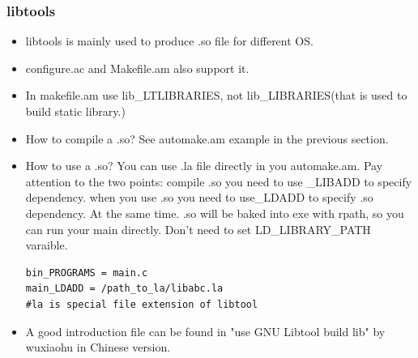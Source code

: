 \documentclass[a4paper,11pt,twoside]{book}
\begin{document}
\subsubsection{libtools}
\begin{itemize}
\item libtools is mainly used to produce .so file for different OS.
\item configure.ac and Makefile.am also support it.

\item In makefile.am use lib\_LTLIBRARIES, not lib\_LIBRARIES(that is used to build static library.)

\item How to compile a .so? See automake.am example in the previous section.
\item How to use a .so? You can use .la file directly in you automake.am. Pay attention to the two points: compile .so you need to use \_LIBADD to specify dependency. when you use .so you need to use\_LDADD to specify .so dependency. At the same time. .so will be baked into exe with rpath, so you can run your main directly. Don't need to set LD\_LIBRARY\_PATH varaible.
\begin{verbatim}
bin_PROGRAMS = main.c
main_LDADD = /path_to_la/libabc.la 
#la is special file extension of libtool
\end{verbatim}

\item A good introduction file can be found in "use GNU Libtool build lib" by wuxiaohu in Chinese version.

\end{itemize}
\end{document}
